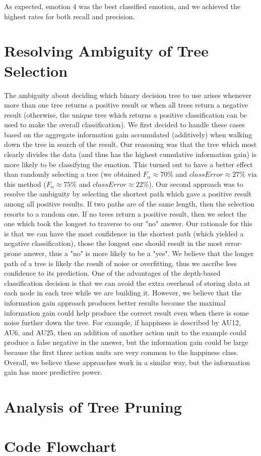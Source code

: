 \documentclass[11pt]{amsart}
\begin{document}
As expected, emotion 4 was the best classified emotion, and we achieved the highest rates for both recall and precision.

\section{Resolving Ambiguity of Tree Selection}
The ambiguity about deciding which binary decision tree to use arises whenever more than one tree returns a positive result or when all trees return a negative result (otherwise, the unique tree which returns a positive classification can be used to make the overall classification).  We first decided to handle these cases based on the aggregate information gain accumulated (additively) when walking down the tree in search of the result.  Our reasoning was that the tree which most clearly divides the data (and thus has the highest cumulative information gain) is more likely to be classifying the emotion.  This turned out to have a better effect than randomly selecting a tree (we obtained $F_{\alpha} \approx 70\%$ and $classError \approx 27\%$ via this method ($F_{\alpha} \approx 75\%$ and $classError \approx 22\%$).  
Our second approach was to resolve the ambiguity by selecting the shortest path which gave a positive result among all positive results.  If two paths are of the same length, then the selection resorts to a random one.  If no trees return a positive result, then we select the one which took the longest to traverse to our "no" answer.  Our rationale for this is that we can have the most confidence in the shortest path (which yielded a negative classification), those the longest one should result in the most error-prone answer, thus a "no" is more likely to be a "yes".  We believe that the longer path of a tree is likely the result of noise or overfitting, thus we ascribe less confidence to its prediction.
One of the advantages of the depth-based classification decision is that we can avoid the extra overhead of storing data at each node in each tree while we are building it.  However, we believe that the information gain approach produces better results because the maximal information gain could help produce the correct result even when there is some noise further down the tree.  For example, if happiness is described by AU12, AU6, and AU25, then an addition of another action unit to the example could produce a false negative in the answer, but the information gain could be large because the first three action units are very common to the happiness class.  Overall, we believe these approaches work in a similar way, but the information gain has more predictive power.
\section{Analysis of Tree Pruning}


\section{Code Flowchart}
\end{document}
